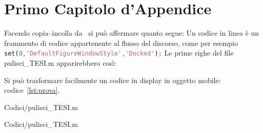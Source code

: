 %
%
\chapter{Primo Capitolo d'Appendice}
%
\label{cap:appendice1}
%
%
\lipsum[1]
%
Facendo copia--incolla da~ si può affermare quanto segue: \omissis Un codice in linea è un frammento di codice appartenente al flusso del discorso, come per esempio \lstinline[language=Matlab]!set(0,'DefaultFigureWindowStyle','Docked');!\omissis
%
%
\omissis Le prime righe del file pulisci\_TESI.m apparirebbero così:
%

%
Si può trasformare facilmente un codice in display in oggetto mobile: codice~\vref{lst:prova}.
%
\begin{lstinputlisting}[float=tb,
		lastline=8,
		language=Python,
		caption={prova},
		label=lst:prova]
		{Codici/pulisci_TESI.m}
\end{lstinputlisting}
%
\lipsum[1]
%
\begin{lstinputlisting}[%
		language=Matlab,
		caption={prova codice intero},
		label=lst:provaIntero]
		{Codici/pulisci_TESI.m}
\end{lstinputlisting}
%
\lipsum[1]
%
